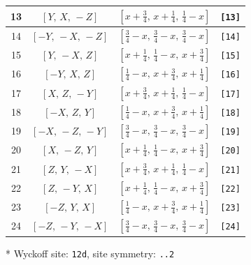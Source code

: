 \documentclass[fleqn,8pt]{jsarticle}
\begin{document}
\begin{longtable}{cccc}
13 & $\left[ Y,\, X,\, - Z \right]$ & $\left[ x + \frac{3}{4},\, x + \frac{1}{4},\, \frac{1}{4} - x \right]$ & {\tt [13]} \\ \hline
14 & $\left[ - Y,\, - X,\, - Z \right]$ & $\left[ \frac{3}{4} - x,\, \frac{3}{4} - x,\, \frac{3}{4} - x \right]$ & {\tt [14]} \\ \hline
15 & $\left[ Y,\, - X,\, Z \right]$ & $\left[ x + \frac{1}{4},\, \frac{1}{4} - x,\, x + \frac{3}{4} \right]$ & {\tt [15]} \\ \hline
16 & $\left[ - Y,\, X,\, Z \right]$ & $\left[ \frac{1}{4} - x,\, x + \frac{3}{4},\, x + \frac{1}{4} \right]$ & {\tt [16]} \\ \hline
17 & $\left[ X,\, Z,\, - Y \right]$ & $\left[ x + \frac{3}{4},\, x + \frac{1}{4},\, \frac{1}{4} - x \right]$ & {\tt [17]} \\ \hline
18 & $\left[ - X,\, Z,\, Y \right]$ & $\left[ \frac{1}{4} - x,\, x + \frac{3}{4},\, x + \frac{1}{4} \right]$ & {\tt [18]} \\ \hline
19 & $\left[ - X,\, - Z,\, - Y \right]$ & $\left[ \frac{3}{4} - x,\, \frac{3}{4} - x,\, \frac{3}{4} - x \right]$ & {\tt [19]} \\ \hline
20 & $\left[ X,\, - Z,\, Y \right]$ & $\left[ x + \frac{1}{4},\, \frac{1}{4} - x,\, x + \frac{3}{4} \right]$ & {\tt [20]} \\ \hline
21 & $\left[ Z,\, Y,\, - X \right]$ & $\left[ x + \frac{3}{4},\, x + \frac{1}{4},\, \frac{1}{4} - x \right]$ & {\tt [21]} \\ \hline
22 & $\left[ Z,\, - Y,\, X \right]$ & $\left[ x + \frac{1}{4},\, \frac{1}{4} - x,\, x + \frac{3}{4} \right]$ & {\tt [22]} \\ \hline
23 & $\left[ - Z,\, Y,\, X \right]$ & $\left[ \frac{1}{4} - x,\, x + \frac{3}{4},\, x + \frac{1}{4} \right]$ & {\tt [23]} \\ \hline
24 & $\left[ - Z,\, - Y,\, - X \right]$ & $\left[ \frac{3}{4} - x,\, \frac{3}{4} - x,\, \frac{3}{4} - x \right]$ & {\tt [24]} \\
\end{longtable}
* Wyckoff site: {\tt 12d}, site symmetry: {\tt ..2}
\renewcommand{\arraystretch}{1.2}
\end{document}
